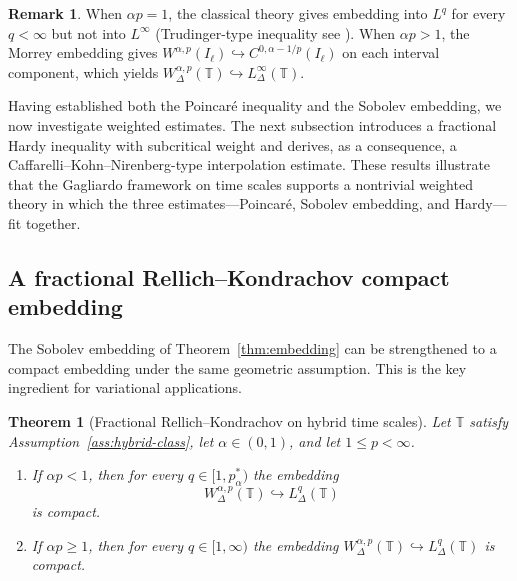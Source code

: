 \documentclass[11pt,a4paper]{article}
\numberwithin{equation}{section}
\newtheorem{theorem}{Theorem}[section]
\theoremstyle{definition}
\newtheorem{remark}[remark]{Remark}
\newcommand{\T}{\mathbb{T}}
\begin{document}
\begin{remark}\label{rem:morrey-trudinger}
When $\alpha p = 1$, the classical theory gives embedding into $L^q$ for
every $q<\infty$ but not into $L^\infty$ (Trudinger-type inequality see \cite[Theorem~8.5]{DiNezzaPalatucciValdinoci2012}). When
$\alpha p > 1$, the Morrey embedding gives
$W^{\alpha,p}(I_\ell)\hookrightarrow C^{0,\alpha-1/p}(I_\ell)$ on each
interval component, which yields
$W^{\alpha,p}_\Delta(\T)\hookrightarrow L^\infty_\Delta(\T)$. 
\end{remark}

Having established both the Poincar\'e inequality and the Sobolev embedding,
we now investigate weighted estimates. The next subsection introduces a
fractional Hardy inequality with subcritical weight and derives, as a
consequence, a Caffarelli--Kohn--Nirenberg-type interpolation estimate. These
results illustrate that the Gagliardo framework on time scales supports a
nontrivial weighted theory in which the three estimates---Poincar\'e,
Sobolev embedding, and Hardy---fit together.
\subsection{A fractional Rellich--Kondrachov compact embedding}

The Sobolev embedding of Theorem~\ref{thm:embedding} can be 
strengthened to a compact embedding under the same geometric assumption. 
This is the key ingredient for variational applications.

\begin{theorem}[Fractional Rellich--Kondrachov on hybrid time scales]
\label{thm:rellich}
Let $\mathbb{T}$ satisfy Assumption~\ref{ass:hybrid-class}, let $\alpha \in (0,1)$, 
and let $1 \le p < \infty$.
\begin{enumerate}
\item[(i)] If $\alpha p < 1$, then for every $q \in [1, p^*_\alpha)$ the embedding
\[
W^{\alpha,p}_\Delta(\mathbb{T}) \hookrightarrow L^q_\Delta(\mathbb{T})
\]
is compact.
\item[(ii)] If $\alpha p \ge 1$, then for every $q \in [1, \infty)$ the embedding 
$W^{\alpha,p}_\Delta(\mathbb{T}) \hookrightarrow L^q_\Delta(\mathbb{T})$ is compact.
\end{enumerate}
\end{theorem}
\end{document}

